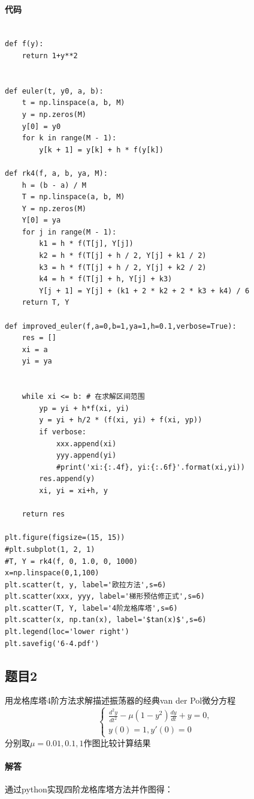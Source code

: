 \paragraph{代码}

\begin{verbatim}

def f(y):
    return 1+y**2


def euler(t, y0, a, b):
    t = np.linspace(a, b, M)
    y = np.zeros(M)
    y[0] = y0
    for k in range(M - 1):
        y[k + 1] = y[k] + h * f(y[k])
        
def rk4(f, a, b, ya, M):
    h = (b - a) / M
    T = np.linspace(a, b, M)
    Y = np.zeros(M)
    Y[0] = ya
    for j in range(M - 1):
        k1 = h * f(T[j], Y[j])
        k2 = h * f(T[j] + h / 2, Y[j] + k1 / 2)
        k3 = h * f(T[j] + h / 2, Y[j] + k2 / 2)
        k4 = h * f(T[j] + h, Y[j] + k3)
        Y[j + 1] = Y[j] + (k1 + 2 * k2 + 2 * k3 + k4) / 6
    return T, Y

def improved_euler(f,a=0,b=1,ya=1,h=0.1,verbose=True):
    res = []
    xi = a 
    yi = ya
    
    
    while xi <= b: # 在求解区间范围
        yp = yi + h*f(xi, yi)
        y = yi + h/2 * (f(xi, yi) + f(xi, yp))
        if verbose:
            xxx.append(xi)
            yyy.append(yi)
            #print('xi:{:.4f}, yi:{:.6f}'.format(xi,yi))
        res.append(y)
        xi, yi = xi+h, y
    
    return res
    
plt.figure(figsize=(15, 15))
#plt.subplot(1, 2, 1)
#T, Y = rk4(f, 0, 1.0, 0, 1000)
x=np.linspace(0,1,100)
plt.scatter(t, y, label='欧拉方法',s=6)
plt.scatter(xxx, yyy, label='梯形预估修正式',s=6)
plt.scatter(T, Y, label='4阶龙格库塔',s=6)
plt.scatter(x, np.tan(x), label='$tan(x)$',s=6)
plt.legend(loc='lower right')
plt.savefig('6-4.pdf')

\end{verbatim}

\subsection{题目2}
用龙格库塔4阶方法求解描述振荡器的经典van der Pol微分方程
$$\left\{
\begin{aligned}
\frac{d^2y}{dt^2}-\mu(1-y^2)\frac{dy}{dt}+y=0,\\
y(0)=1,y'(0)=0
\end{aligned}
\right.$$
分别取$\mu=0.01,0.1,1$作图比较计算结果

\paragraph{解答}
通过python实现四阶龙格库塔方法并作图得：

